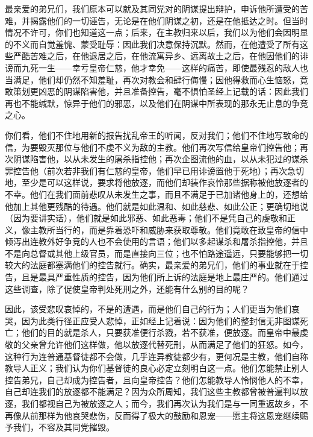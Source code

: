 最亲爱的弟兄们，我们原本可以就及其同党对的阴谋提出辩护，申诉他所遭受的苦难，并揭露他们的一切诬告，无论是在他们阴谋之初，还是在他抵达之时。但当时情况不许可，你们也知道这一点；后来，在主教归来以后，我们以为他们会因明显的不义而自觉羞愧、蒙受耻辱：因此我们决意保持沉默。然而，在他遭受了所有这些严酷苦难之后，在他退居之后，在他流寓异乡、远离故土之后，在他因他们的诽谤而九死一生——幸亏皇帝仁慈，他才幸免——这样的痛苦，即使最残忍的敌人也当满足，他们却仍然不知羞耻，再次对教会和肆行侮慢；因他得救而心生恼怒，竟敢策划更凶恶的阴谋陷害他，并且准备控告，毫不惧怕圣经上记载的话：因此我们再也不能缄默，惊异于他们的邪恶，以及他们在阴谋中所表现的那永无止息的争竞之心。\par

你们看，他们不住地用新的报告扰乱帝王的听闻，反对我们；他们不住地写致命的信，为要毁灭那位与他们不虔不义为敌的主教。他们再次写信给皇帝们控告他；再次阴谋陷害他，以从未发生的屠杀指控他；再次企图流他的血，以从未犯过的谋杀罪控告他（前次若非我们有仁慈的皇帝，他们早已用诽谤置他于死地）；再次急切地，至少是可以这样说，要求将他放逐，而他们却装作哀怜那些据称被他放逐者的不幸。他们在我们面前悲叹从未发生之事，而且不满足于已加诸他身上的，还想给他加上其他更残酷的待遇。他们就是如此温和、如此慈悲、如此公正；更确切地说（因为要讲实话），他们就是如此邪恶、如此恶毒；他们不是凭自己的虔敬和正义，像主教所当行的，而是靠着恐吓和威胁来获取尊敬。他们竟敢在致皇帝的信中倾泻出连教外好争竞的人也不会使用的言语；他们以多起谋杀和屠杀指控他，并且不是向总督或其他上级官员，而是直接向三位；也不怕路途遥远，只要能够把一切较大的法庭都塞满他们的控告就行。确实，最亲爱的弟兄们，他们的事业就在于控告，且是最具严重性质的控告，因为他们所上诉的法庭是地上最庄严的。他们通过这些调查，除了促使皇帝判处死刑之外，还能有什么别的目的呢？\par

因此，该受悲叹哀悼的，不是的遭遇，而是他们自己的行为；人们更当为他们哀哭，因为此类行径正应受人悲悼，正如经上记着说：因为他们的整封信无非图谋死亡；他们的目的就是杀人，只要获准便行杀戮，若不获准，便放逐。而皇帝中最虔敬的父亲曾允许他们这样做，他以放逐代替死刑，从而满足了他们的狂怒。如今，这种行为连普通基督徒都不会做，几乎连异教徒都少有，更何况是主教，他们自称教导人正义；我们认为你们基督徒的良心必定立刻明白这一点。他们怎能禁止别人控告弟兄，自己却成为控告者，且向皇帝控告？他们怎能教导人怜悯他人的不幸，自己却连我们的放逐都不能满足？因为众所周知，我们这些主教都曾被普遍判以放逐，我们都视自己为被放逐之人；而今，我们再次认为我们是与一同重返故乡，不再像从前那样为他哀哭悲伤，反而得了极大的鼓励和恩宠——愿主将这恩宠继续赐予我们，不容及其同党摧毁。\par

